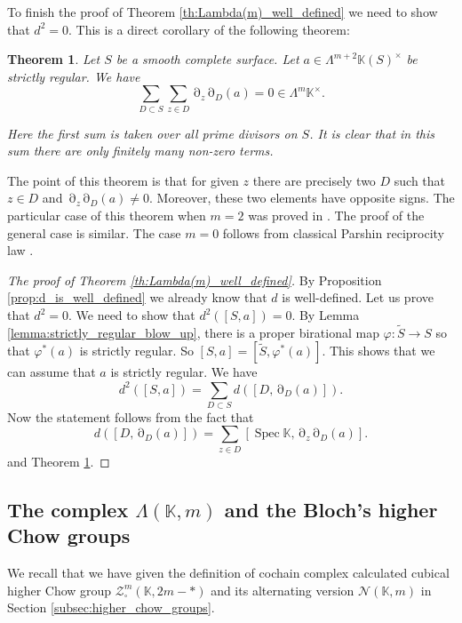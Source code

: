 \documentclass[12pt]{extarticle}
\newtheorem{theorem}{Theorem}[section]
\def\mb{\mathbb}
\def\mc{\mathcal}
\def\L{\Lambda}
\def\k{\mb K}
\def\wt{\widetilde}
\newcommand{\EP}[2]{{\Lambda^{#1}\k(#2)^\times}}
\DeclareMathOperator{\ts}{\partial}
\DeclareMathOperator{\spec}{Spec}
\begin{document}
To finish the proof of Theorem \ref{th:Lambda(m)_well_defined} we need to show that $d^2=0$. This is a direct corollary of the following theorem:

\begin{theorem}
\label{th:Parshin_reciprocity_law}
    Let $S$ be a smooth complete surface. Let $a\in\EP{m+2}{S}$ be strictly regular. We have
    $$\sum\limits_{D\subset S}\sum\limits_{z\in D}\ts_{z}\ts_{D}(a)=0\in \Lambda^m\k^\times.$$
    
    Here the first sum is taken over all prime divisors on $S$. It is clear that in this sum there are only finitely many non-zero terms.
\end{theorem}

The point of this theorem is that for given $z$ there are precisely two $D$ such that $z\in D$ and $\ts_{z}\ts_{D}(a)\ne 0$. Moreover, these two elements have opposite signs. The particular case of this theorem when $m=2$ was proved in \cite[Theorem 2.15]{bolbachan_2023_chow}. The proof of the general case is similar. The case $m=0$ follows from classical Parshin reciprocity law \cite{parshin1975class}.



\begin{proof}[The proof of Theorem \ref{th:Lambda(m)_well_defined}]
    By Proposition \ref{prop:d_is_well_defined} we already know that $d$ is well-defined. Let us prove that $d^2=0$. We need to show that $d^2([S,a])=0$. By Lemma \ref{lemma:strictly_regular_blow_up}, there is a proper birational map $\varphi\colon \wt S\to S$ so that $\varphi^*(a)$ is strictly regular. So $[S,a]=[\wt S,\varphi^*(a)]$. This shows that we can assume that $a$ is strictly regular. 
    We have 
    $$d^2([S,a]) = \sum\limits_{D\subset S}d([D,\ts_D(a)]).$$
    Now the statement follows from the fact that
        $$d([D,\ts_D(a)])=\sum_{z\in D}[\spec\k,\ts_{z}\ts_{D}(a)].$$
and Theorem \ref{th:Parshin_reciprocity_law}.
\end{proof}

\subsection{The complex $\L(\k,m)$ and the Bloch's higher Chow groups}
\label{subsec:lambda_higher_chow_groups}
We recall that we have given the definition of cochain complex calculated  cubical higher Chow group $\mc Z_\square^m(\k,2m-*)$ and its alternating version $\mc N(\k,m)$ in Section \ref{subsec:higher_chow_groups}.
\end{document}
